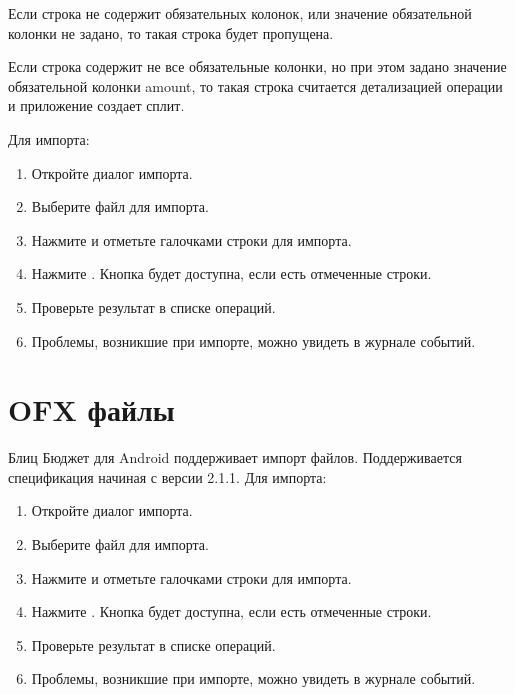 \documentclass[a4paper,10pt,russian]{sphinxmanual}
\begin{document}
Если строка не содержит обязательных колонок, или значение обязательной колонки не задано, то такая
строка будет пропущена.

Если строка содержит не все обязательные колонки, но при этом задано значение обязательной колонки amount, то такая
строка считается детализацией операции и приложение создает сплит.

Для импорта:
\begin{enumerate}
\def\theenumi{\arabic{enumi}}
\def\labelenumi{\theenumi .}
\makeatletter\def\p@enumii{\p@enumi \theenumi .}\makeatother
\item {} 
Откройте диалог импорта.

\item {} 
Выберите файл для импорта.

\item {} 
Нажмите  и отметьте галочками строки для импорта.

\item {} 
Нажмите . Кнопка будет доступна, если есть отмеченные строки.

\item {} 
Проверьте результат в списке операций.

\item {} 
Проблемы, возникшие при импорте, можно увидеть в журнале событий.

\end{enumerate}

\noindent{}
\noindent{}


\section{OFX файлы}
\label{\detokenize{import:id4}}
Блиц Бюджет для Android поддерживает импорт  файлов. Поддерживается спецификация начиная с версии 2.1.1. Для импорта:
\begin{enumerate}
\def\theenumi{\arabic{enumi}}
\def\labelenumi{\theenumi .}
\makeatletter\def\p@enumii{\p@enumi \theenumi .}\makeatother
\item {} 
Откройте диалог импорта.

\item {} 
Выберите файл для импорта.

\item {} 
Нажмите  и отметьте галочками строки для импорта.

\item {} 
Нажмите . Кнопка будет доступна, если есть отмеченные строки.

\item {} 
Проверьте результат в списке операций.

\item {} 
Проблемы, возникшие при импорте, можно увидеть в журнале событий.

\end{enumerate}
\end{document}
